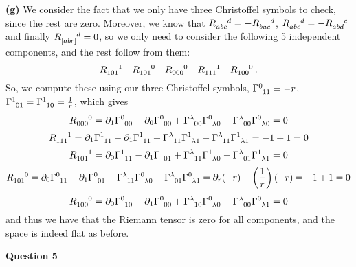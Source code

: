 \documentclass[10pt]{article}
\begin{document}
\textbf{(g)} We consider the fact that we only have three Christoffel symbols to check, since the rest are zero. Moreover, we know that $\tensor{R}{_{abc}^{d}} = -\tensor{R}{_{bac}^{d}}$, $\tensor{R}{_{abc}^{d}} = -\tensor{R}{_{abd}^{c}}$ and finally $\tensor{R}{_{[abc]}^{d}} = 0$, so we only need to consider the following 5 independent components, and the rest follow from them:
\[ \tensor{R}{_{101}^{1}} \quad \tensor{R}{_{101}^{0}} \quad \tensor{R}{_{000}^{0}} \quad \tensor{R}{_{111}^{1}} \quad \tensor{R}{_{100}^{0}} \, .\]
So, we compute these using our three Christoffel symbols, $\tensor{\Gamma}{^{0}_{11}} = -r$, $\tensor{\Gamma}{^{1}_{01}} = \tensor{\Gamma}{^{1}_{10}} = \frac{1}{r}$, which gives
\[ \tensor{R}{_{000}^{0}} = \partial_{1}\tensor{\Gamma}{^{0}_{00}} - \partial_{0}\tensor{\Gamma}{^{0}_{00}} + \tensor{\Gamma}{^{\lambda}_{00}}\tensor{\Gamma}{^{0}_{\lambda 0}} - \tensor{\Gamma}{^{\lambda}_{00}}\tensor{\Gamma}{^{0}_{\lambda 0}} = 0\]
\[ \tensor{R}{_{111}^{1}} = \partial_{1}\tensor{\Gamma}{^{1}_{11}} - \partial_{1}\tensor{\Gamma}{^{1}_{11}} + \tensor{\Gamma}{^{\lambda}_{11}}\tensor{\Gamma}{^{1}_{\lambda 1}} - \tensor{\Gamma}{^{\lambda}_{11}}\tensor{\Gamma}{^{1}_{\lambda 1}} = -1 + 1 = 0\]
\[ \tensor{R}{_{101}^{1}} = \partial_{0}\tensor{\Gamma}{^{1}_{11}} - \partial_{1}\tensor{\Gamma}{^{1}_{01}} + \tensor{\Gamma}{^{\lambda}_{11}}\tensor{\Gamma}{^{1}_{\lambda 0}} - \tensor{\Gamma}{^{\lambda}_{01}}\tensor{\Gamma}{^{1}_{\lambda 1}} = 0\]
\[ \tensor{R}{_{101}^{0}} = \partial_{0}\tensor{\Gamma}{^{0}_{11}} - \partial_{1}\tensor{\Gamma}{^{0}_{01}} + \tensor{\Gamma}{^{\lambda}_{11}}\tensor{\Gamma}{^{0}_{\lambda 0}} - \tensor{\Gamma}{^{\lambda}_{01}}\tensor{\Gamma}{^{0}_{\lambda 1}} = \partial_{r}(-r) - \left(\frac{1}{r}\right)(-r) = -1 + 1 = 0\]
\[ \tensor{R}{_{100}^{0}} = \partial_{0}\tensor{\Gamma}{^{0}_{10}} - \partial_{1}\tensor{\Gamma}{^{0}_{00}} + \tensor{\Gamma}{^{\lambda}_{10}}\tensor{\Gamma}{^{0}_{\lambda 0}} - \tensor{\Gamma}{^{\lambda}_{00}}\tensor{\Gamma}{^{0}_{\lambda 1}} = 0\]
and thus we have that the Riemann tensor is zero for all components, and the space is indeed flat as before.

\newpage
\textbf{Question 5}
\end{document}
